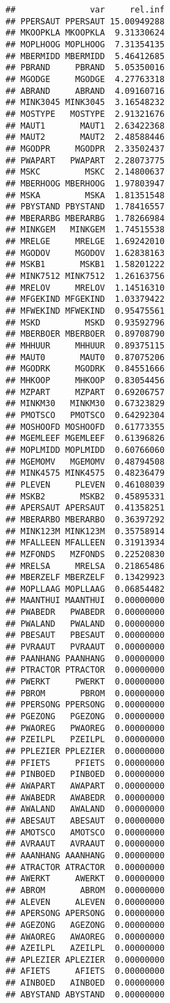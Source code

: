 \documentclass[
]{article}
\begin{document}
\begin{verbatim}
##               var     rel.inf
## PPERSAUT PPERSAUT 15.00949288
## MKOOPKLA MKOOPKLA  9.31330624
## MOPLHOOG MOPLHOOG  7.31354135
## MBERMIDD MBERMIDD  5.46412685
## PBRAND     PBRAND  5.05350016
## MGODGE     MGODGE  4.27763318
## ABRAND     ABRAND  4.09160716
## MINK3045 MINK3045  3.16548232
## MOSTYPE   MOSTYPE  2.91321676
## MAUT1       MAUT1  2.63422368
## MAUT2       MAUT2  2.48588446
## MGODPR     MGODPR  2.33502437
## PWAPART   PWAPART  2.28073775
## MSKC         MSKC  2.14800637
## MBERHOOG MBERHOOG  1.97803947
## MSKA         MSKA  1.81351548
## PBYSTAND PBYSTAND  1.78416557
## MBERARBG MBERARBG  1.78266984
## MINKGEM   MINKGEM  1.74515538
## MRELGE     MRELGE  1.69242010
## MGODOV     MGODOV  1.62838163
## MSKB1       MSKB1  1.58201222
## MINK7512 MINK7512  1.26163756
## MRELOV     MRELOV  1.14516310
## MFGEKIND MFGEKIND  1.03379422
## MFWEKIND MFWEKIND  0.95475561
## MSKD         MSKD  0.93592796
## MBERBOER MBERBOER  0.89708790
## MHHUUR     MHHUUR  0.89375115
## MAUT0       MAUT0  0.87075206
## MGODRK     MGODRK  0.84551666
## MHKOOP     MHKOOP  0.83054456
## MZPART     MZPART  0.69206757
## MINKM30   MINKM30  0.67323829
## PMOTSCO   PMOTSCO  0.64292304
## MOSHOOFD MOSHOOFD  0.61773355
## MGEMLEEF MGEMLEEF  0.61396826
## MOPLMIDD MOPLMIDD  0.60766060
## MGEMOMV   MGEMOMV  0.48794508
## MINK4575 MINK4575  0.48236479
## PLEVEN     PLEVEN  0.46108039
## MSKB2       MSKB2  0.45895331
## APERSAUT APERSAUT  0.41358251
## MBERARBO MBERARBO  0.36397292
## MINK123M MINK123M  0.35758914
## MFALLEEN MFALLEEN  0.31913934
## MZFONDS   MZFONDS  0.22520830
## MRELSA     MRELSA  0.21865486
## MBERZELF MBERZELF  0.13429923
## MOPLLAAG MOPLLAAG  0.06854482
## MAANTHUI MAANTHUI  0.00000000
## PWABEDR   PWABEDR  0.00000000
## PWALAND   PWALAND  0.00000000
## PBESAUT   PBESAUT  0.00000000
## PVRAAUT   PVRAAUT  0.00000000
## PAANHANG PAANHANG  0.00000000
## PTRACTOR PTRACTOR  0.00000000
## PWERKT     PWERKT  0.00000000
## PBROM       PBROM  0.00000000
## PPERSONG PPERSONG  0.00000000
## PGEZONG   PGEZONG  0.00000000
## PWAOREG   PWAOREG  0.00000000
## PZEILPL   PZEILPL  0.00000000
## PPLEZIER PPLEZIER  0.00000000
## PFIETS     PFIETS  0.00000000
## PINBOED   PINBOED  0.00000000
## AWAPART   AWAPART  0.00000000
## AWABEDR   AWABEDR  0.00000000
## AWALAND   AWALAND  0.00000000
## ABESAUT   ABESAUT  0.00000000
## AMOTSCO   AMOTSCO  0.00000000
## AVRAAUT   AVRAAUT  0.00000000
## AAANHANG AAANHANG  0.00000000
## ATRACTOR ATRACTOR  0.00000000
## AWERKT     AWERKT  0.00000000
## ABROM       ABROM  0.00000000
## ALEVEN     ALEVEN  0.00000000
## APERSONG APERSONG  0.00000000
## AGEZONG   AGEZONG  0.00000000
## AWAOREG   AWAOREG  0.00000000
## AZEILPL   AZEILPL  0.00000000
## APLEZIER APLEZIER  0.00000000
## AFIETS     AFIETS  0.00000000
## AINBOED   AINBOED  0.00000000
## ABYSTAND ABYSTAND  0.00000000
\end{verbatim}
\end{document}
